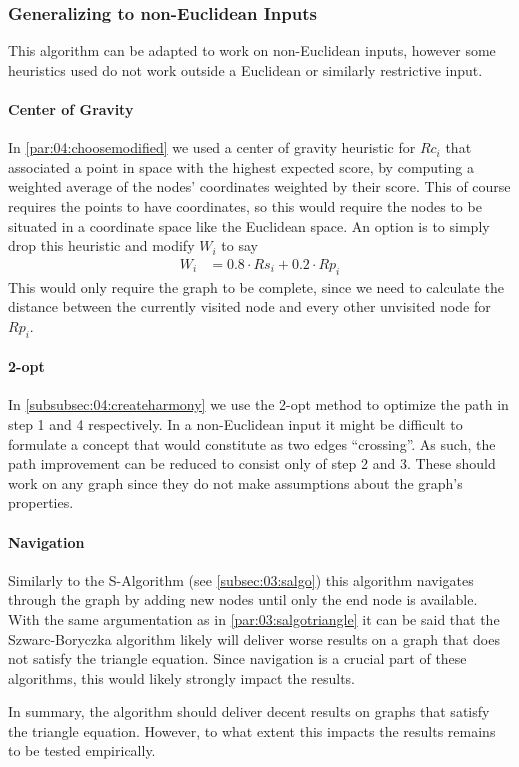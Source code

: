 \subsubsection{Generalizing to non-Euclidean Inputs}

This algorithm can be adapted to work on non-Euclidean inputs, however some heuristics used do not work outside a Euclidean or similarly restrictive input.

\paragraph{Center of Gravity}
In \cref{par:04:choosemodified} we used a center of gravity heuristic for $Rc_i$ that associated a point in space with the highest expected score,
by computing a weighted average of the nodes' coordinates weighted by their score.
This of course requires the points to have coordinates, so this would require the nodes to be situated in a coordinate space like the Euclidean space.
An option is to simply drop this heuristic and modify $W_i$ to say
\begin{align*}
	W_i & = 0.8 \cdot Rs_i + 0.2 \cdot Rp_i
\end{align*}
This would only require the graph to be complete, since we need to calculate the distance between the currently visited node and every other unvisited node for $Rp_i$.

\paragraph{2-opt}
In \cref{subsubsec:04:createharmony} we use the 2-opt method \cite{croes_method_1958} to optimize the path in step 1 and 4 respectively.
In a non-Euclidean input it might be difficult to formulate a concept that would constitute as two edges \enquote{crossing}.
As such, the path improvement can be reduced to consist only of step 2 and 3.
These should work on any graph since they do not make assumptions about the graph's properties.

\paragraph{Navigation}
Similarly to the S-Algorithm (see \cref{subsec:03:salgo}) this algorithm navigates through the graph by adding new nodes until only the end node is available.
With the same argumentation as in \cref{par:03:salgotriangle} it can be said that the Szwarc-Boryczka algorithm likely will deliver worse results on a graph that does not satisfy the triangle equation.
Since navigation is a crucial part of these algorithms, this would likely strongly impact the results.

In summary, the algorithm should deliver decent results on graphs that satisfy the triangle equation.
However, to what extent this impacts the results remains to be tested empirically.
